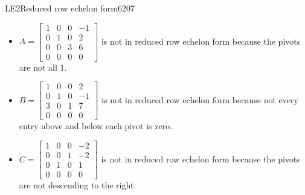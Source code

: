 \begin{exercise}{LE2}{Reduced row echelon form}{6207}
\begin{exerciseStatement}
     \end{exerciseStatement}
 \begin{exerciseAnswer} 

\begin{itemize}
\item  

 \(A=\left[\begin{array}{cccc}
1 & 0 & 0 & -1 \\
0 & 1 & 0 & 2 \\
0 & 0 & 3 & 6 \\
0 & 0 & 0 & 0
\end{array}\right]\) is not in reduced row echelon form because the pivots are not all \(1\). 

 
\item  

 \(B=\left[\begin{array}{cccc}
1 & 0 & 0 & 2 \\
0 & 1 & 0 & -1 \\
3 & 0 & 1 & 7 \\
0 & 0 & 0 & 0
\end{array}\right]\) is not in reduced row echelon form because not every entry above and below each pivot is zero. 

 
\item  

 \(C=\left[\begin{array}{cccc}
1 & 0 & 0 & -2 \\
0 & 0 & 1 & -2 \\
0 & 1 & 0 & 1 \\
0 & 0 & 0 & 0
\end{array}\right]\) is not in reduced row echelon form because the pivots are not descending to the right. 

 
\end{itemize}

     \end{exerciseAnswer}
 \end{exercise}


